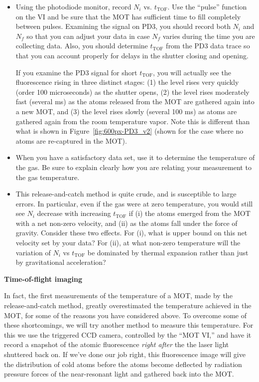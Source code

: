\documentclass{../lab}
\begin{document}
\begin{itemize}
    \item Using the photodiode monitor, record $N_i$ vs. $t_\text{TOF}$. Use the ``pulse'' function on the VI and be sure that the MOT has sufficient time to fill completely between pulses. Examining the signal on PD3, you should record both $N_i$ and $N_f$ so that you can adjust your data in case $N_f$ varies during the time you are collecting data. Also, you should determine $t_\text{TOF}$ from the PD3 data trace so that you can account properly for delays in the shutter closing and opening.

    If you examine the PD3 signal for short $t_\text{TOF}$, you will actually see the fluorescence rising in three distinct stages: (1) the level rises very quickly (order 100 microseconds) as the shutter opens, (2) the level rises moderately fast (several ms) as the atoms released from the MOT are gathered again into a new MOT, and (3) the level rises slowly (several 100 ms) as atoms are gathered again from the room temperature vapor. Note this is different than what is shown in Figure~\ref{fig:600px-PD3_v2} (shown for the case where no atoms are re-captured in the MOT).

    \item When you have a satisfactory data set, use it to determine the temperature of the gas. Be sure to explain clearly how you are relating your measurement to the gas temperature.

    \item This release-and-catch method is quite crude, and is susceptible to large errors. In particular, even if the gas were at zero temperature, you would still see $N_i$ decrease with increasing $t_\text{TOF}$ if (i) the atoms emerged from the MOT with a net non-zero velocity, and (ii) as the atoms fall under the force of gravity. Consider these two effects. For (i), what is upper bound on this net velocity set by your data? For (ii), at what non-zero temperature will the variation of $N_i$ vs $t_\text{TOF}$ be dominated by thermal expansion rather than just by gravitational acceleration?
\end{itemize}

\textbf{Time-of-flight imaging}

In fact, the first measurements of the temperature of a MOT, made by the release-and-catch method, greatly overestimated the temperature achieved in the MOT, for some of the reasons you have considered above. To overcome some of these shortcomings, we will try another method to measure this temperature. For this we use the triggered CCD camera, controlled by the ``MOT VI,'' and have it record a snapshot of the atomic fluorescence \emph{right after} the the laser light shuttered back on. If we've done our job right, this fluorescence image will give the distribution of cold atoms before the atoms become deflected by radiation pressure forces of the near-resonant light and gathered back into the MOT.
\end{document}
